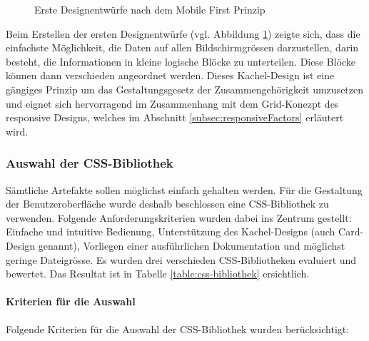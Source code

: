 \begin{figure}[h!]
	\centering
	\caption{Erste Designentwürfe nach dem Mobile First Prinzip}
	\label{img:scribbles}
\end{figure}

Beim Erstellen der ersten Designentwürfe (vgl. Abbildung \ref{img:scribbles}) zeigte sich, dass die einfachste Möglichkeit, die Daten auf allen Bildschirmgrössen darzustellen, darin besteht, die Informationen in kleine logische Blöcke zu unterteilen. Diese Blöcke können dann verschieden angeordnet werden. Dieses Kachel-Design ist eine gängiges Prinzip um das Gestaltungsgesetz der Zusammengehörigkeit umzusetzen und eignet sich hervorragend im Zusammenhang mit dem Grid-Konezpt des responsive Designs, welches im Abschnitt \ref{subsec:responsiveFactors} erläutert wird.


\subsubsection{Auswahl der CSS-Bibliothek}
Sämtliche Artefakte sollen möglichst einfach gehalten werden. Für die Gestaltung der Benutzeroberfläche wurde deshalb beschlossen eine CSS-Bibliothek zu verwenden. Folgende Anforderungskriterien wurden dabei ins Zentrum gestellt: Einfache und intuitive Bedienung, Unterstützung des Kachel-Designs (auch Card-Design genannt), Vorliegen einer ausführlichen Dokumentation und möglichst geringe Dateigrösse. Es wurden drei verschieden CSS-Bibliotheken evaluiert und bewertet. Das Resultat ist in Tabelle  \ref{table:css-bibliothek} ersichtlich.

\paragraph*{Kriterien für die Auswahl}
Folgende Kriterien für die Auswahl der CSS-Bibliothek wurden berücksichtigt:

